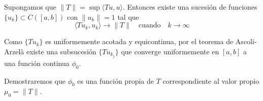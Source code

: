 \documentclass[main.tex]{subfiles}
\begin{document}
Supongamos que $\|T\| = \sup \langle Tu,u\rangle$. Entonces existe una sucesión de funciones $\{u_k\} \subset C([a,b])$ con $\|u_k\| = 1$ tal que
\[
\langle Tu_k, u_k \rangle \to \|T\| \quad \text{cuando} \quad k \to \infty
\]

Como $\{Tu_k\}$ es uniformemente acotada y equicontinua, por el teorema de Ascoli-Arzelà existe una subsucesión $\{Tu_{k_j}\}$ que converge uniformemente en $[a,b]$ a una función continua $\phi_0$.

Demostraremos que $\phi_0$ es una función propia de $T$ correspondiente al valor propio $\mu_0 = \|T\|$.
\end{document}
